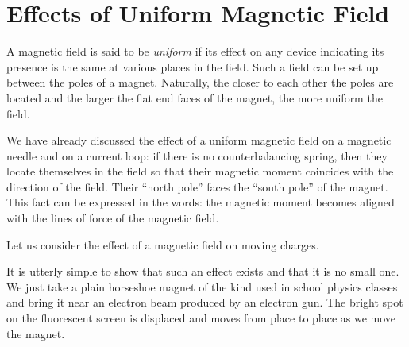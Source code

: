 \section{Effects of Uniform Magnetic Field}
A magnetic field is said to be \emph{uniform} if its effect on any device indicating its presence is the same at various places in the field. Such a field can be set up between the poles of a magnet. Naturally, the closer to each other the poles are located and the larger the flat end faces of the magnet, the more uniform the field.

We have already discussed the effect of a uniform magnetic field on a magnetic needle and on a current loop: if there is no counterbalancing spring, then they locate themselves in the field so that their magnetic moment coincides with the direction of the field. Their ``north pole'' faces the ``south pole'' of the magnet. This fact can be expressed in the words: the magnetic moment becomes aligned with the lines of force of the magnetic field.

Let us consider the effect of a magnetic field on moving charges.

It is utterly simple to show that such an effect exists and that it is no small one. We just take a plain horseshoe magnet of the kind used in school physics classes and bring it near an electron beam produced by an electron gun. The bright spot on the fluorescent screen is displaced and moves from place to place as we move the magnet.

